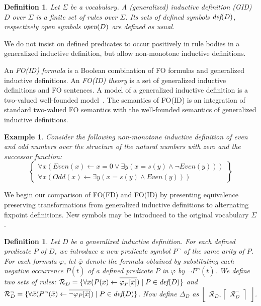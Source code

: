 \documentclass{tlp}
\newcommand{\rul}{\leftarrow}
\newcommand{\id}[1]{\ensuremath{\left \{ \begin{array}{l}#1\end{array} \right \} }}
\newcommand{\lfd}[1]{\ensuremath{\left \lfloor \begin{array}{l}#1\end{array} \right \rfloor }}
\newcommand{\gfd}[1]{\ensuremath{\left \lceil \begin{array}{l}#1\end{array} \right \rceil}}
\newcommand{\D}{D\xspace}
\newcommand{\LFD}{\ensuremath{\Delta}\xspace}
\newcommand{\defp}[1]{\ensuremath{\mbox{\it def}(#1)}\xspace}
\newcommand{\openp}[1]{\ensuremath{\mbox{\it open}(#1)}\xspace}
\newcommand{\Rules}{\ensuremath{\mathcal{R}}\xspace}
\newtheorem{example}[lemma]{Example}
\newtheorem{definition}[lemma]{Definition}
\begin{document}
\begin{definition}
Let $\Sigma$ be a vocabulary. A {\em (generalized) inductive definition (GID)} $D$ over $\Sigma$ is a finite set of rules over $\Sigma$. Its sets of defined symbols
$\defp{\D}$, respectively open symbols $\openp{D}$ are defined as usual.
\end{definition}
We do not insist on defined predicates to occur positively in rule bodies in a
generalized inductive definition, but allow non-monotone inductive definitions.

An {\em FO(ID) formula} is a Boolean combination of FO formulas and
generalized inductive definitions. An {\em FO(ID) theory} is a set of
generalized inductive definitions and FO sentences. A model of a generalized inductive definition is a two-valued well-founded model~\cite{tocl/DeneckerT08}. The semantics of FO(ID) is an integration of standard two-valued FO semantics with the well-founded semantics of generalized inductive definitions.

\begin{example}
Consider the following non-monotone inductive definition of even
and odd numbers over the structure of the natural numbers with zero and the successor function:
\[\id{ \forall x (Even(x) \rul x=0 \lor \exists y (x = s(y) \land
\neg Even(y)))\\
\forall x (Odd(x)\rul \exists y (x = s(y) \land Even(y)))}\]
\end{example}

We begin our comparison of FO(FD) and FO(ID) by presenting equivalence preserving transformations from generalized inductive definitions to alternating fixpoint definitions. New symbols may be introduced to the original vocabulary $\Sigma$.

\begin{definition}
Let $D$ be a generalized inductive definition. For each defined predicate $P$ of $D$, we introduce a new predicate symbol $P^{\neg}$ of the same arity of $P$. For each formula $\varphi$, let $\overline{\varphi}$ denote the formula obtained by substituting each negative occurrence $P(\bar t)$ of a defined predicate $P$ in $\varphi$ by $\lnot P^{\neg}(\bar t)$. We define two sets of rules: $\Rules_{D} = \{ \forall \bar{x}(P(\bar x) \rul \overline{\varphi_P[\bar{x}]}) \mid P \in \defp{D} \}$ and $\Rules^{\neg}_{D} = \{ \forall \bar{x}(P^{\neg}(\bar x) \rul \overline{\neg \varphi_P[\bar{x}]}) \mid P \in \defp{D} \}$. Now define $\LFD_{D}$ as $\lfd{  \Rules_\D , \gfd{\Rules^{\neg}_\D}}$.
\end{definition}
\end{document}
